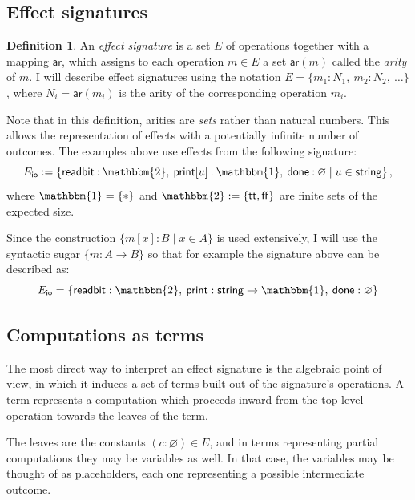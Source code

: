\documentclass[11pt,oneside,draft]{book}
\theoremstyle{definition}
\newtheorem{definition}[theorem]{Definition}
\newcommand{\kw}[1]{\ensuremath{ \mathsf{#1} }}
\begin{document}

\subsection{Effect signatures} %

\begin{definition} \label{def:esig}
An \emph{effect signature}
is a set $E$ of operations
together with a mapping $\kw{ar}$,
which assigns to each operation $m \in E$ a set $\kw{ar}(m)$
called the \emph{arity} of $m$.
I will describe effect signatures using the notation
$E = \{ m_1 \mathbin: N_1, \: m_2 \mathbin: N_2, \: \ldots \}$,
where $N_i = \kw{ar}(m_i)$ is the arity of the corresponding operation $m_i$.
\end{definition}

Note that in this definition,
arities are \emph{sets} rather than natural numbers.
This allows the representation of effects
with a potentially infinite number of outcomes.
The examples above
use effects from the following signature:
\[
  E_\kw{io} :=
  \{ \kw{readbit} \mathbin: \mathbbm{2}, \:
     \kw{print}[u] \mathbin: \mathbbm{1}, \:
     \kw{done} \mathbin: \varnothing \mid
     u \in \kw{string} \}
  \,,
\]
where $\mathbbm{1} = \{ * \}$ and $\mathbbm{2} := \{ \kw{tt}, \kw{ff} \}$
are finite sets of the expected size.

Since the construction
$\{ m[x] : B \mid x \in A \}$
is used extensively,
I will use the syntactic sugar
$\{ m : A \rightarrow B \}$
so that for example the signature above can be described as:
\[
  E_\kw{io} =
  \{ \kw{readbit} : \mathbbm{2}, \:
     \kw{print} : \kw{string} \rightarrow \mathbbm{1}, \:
     \kw{done} : \varnothing \}
\]


\subsection{Computations as terms} \label{sec:bg:terms} %

The most direct way to interpret an effect signature
is the algebraic point of view,
in which it induces a set of terms
built out of the signature's operations.
A term represents a computation which proceeds inward
from the top-level operation
towards the leaves of the term.

The leaves are the constants $(c \mathbin: \varnothing) \in E$,
and in terms representing partial computations
they may be variables as well.
In that case,
the variables may be thought of as placeholders,
each one representing a possible intermediate outcome.
\end{document}
